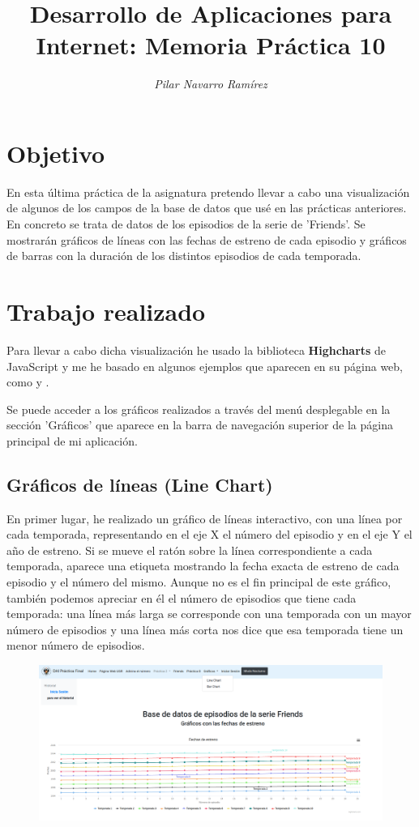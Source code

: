 \documentclass[12pt]{article}
\title{\huge{\textbf{ Desarrollo de Aplicaciones para Internet: Memoria Práctica 10 }}}%
\author{\small \textit{{Pilar Navarro Ramírez}}}%
\begin{document}
\maketitle
\newpage
\tableofcontents
\newpage
\section{Objetivo}
En esta última práctica de la asignatura pretendo llevar a cabo una visualización de algunos de los campos de la base de datos que usé en las prácticas anteriores. En concreto se trata de datos de los episodios de la serie de 'Friends'. Se mostrarán gráficos de líneas con las fechas de estreno de cada episodio y gráficos de barras con la duración de los distintos episodios de cada temporada. 
\section{Trabajo realizado}

Para llevar a cabo dicha visualización he usado la biblioteca \textbf{Highcharts} de JavaScript y me he basado en algunos ejemplos que aparecen en su página web, como \cite{2} y \cite{3}. 

Se puede acceder a los gráficos realizados a través del menú desplegable en la sección 'Gráficos' que aparece en la barra de navegación superior de la página principal de mi aplicación. 

\subsection{Gráficos de líneas (Line Chart)}

En primer lugar, he realizado un gráfico de líneas interactivo, con una línea por cada temporada, representando en el eje X el número del episodio y en el eje Y el año de estreno. Si se mueve el ratón sobre la línea correspondiente a cada temporada, aparece una etiqueta mostrando la fecha exacta de estreno de cada episodio y el número del mismo. Aunque no es el fin principal de este gráfico, también podemos apreciar en él el número de episodios que tiene cada temporada: una línea más larga se corresponde con una temporada con un mayor número de episodios y una línea más corta nos dice que esa temporada tiene un menor número de episodios. 

\begin{figure}[H]
	\centering
	\includegraphics[width=1.1\linewidth]{captura1}
	\caption{}
	\label{fig:captura1}
\end{figure}
\end{document}
